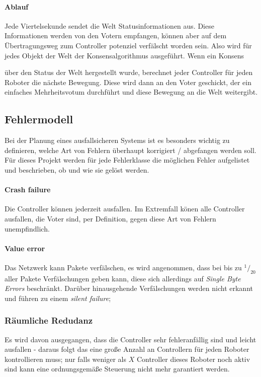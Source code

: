 \paragraph{Ablauf} Jede Viertelsekunde sendet die Welt Statusinformationen aus. Diese Informationen werden von den Votern empfangen, k{\"{o}}nnen
aber auf dem {\"{U}}bertragungsweg zum Controller potenziel verf{\"{a}}lscht worden sein. Also wird f{\"{u}}r jedes Objekt der Welt der Konsensalgorithmus ausgef{\"{u}}hrt. Wenn ein Konsens {\"{u}ber den Status der Welt hergestellt wurde, berechnet 
jeder Controller f{\"{u}}r jeden Roboter die n{\"{a}}chste Bewegung. Diese wird dann an den Voter geschickt, der ein einfaches Mehrheitsvotum durchf{\"{u}}hrt und diese Bewegung an die Welt weitergibt.

\subsection{Fehlermodell} \label{error-model}
Bei der Planung eines ausfallsicheren Systems ist es besonders wichtig zu definieren, welche Art von Fehlern
{\"{u}}berhaupt korrigiert / abgefangen werden soll. F{\"{u}}r dieses Projekt werden f{\"{u}}r jede Fehlerklasse
die m{\"{o}}glichen Fehler aufgelistet und beschrieben, ob und wie sie gel{\"{o}}st werden.

\paragraph{Crash failure} Die Controller k{\"{o}}nnen jederzeit ausfallen. Im Extremfall k{\"{o}}nen alle Controller ausfallen, die Voter sind, per Definition, gegen diese Art von Fehlern unempfindlich.

\paragraph{Value error} Das Netzwerk kann Pakete verf{\"{a}}lschen, es wird angenommen, dass bei bis zu $^1/_{20}$ aller Pakete Verf{\"{a}}lschungen geben kann, diese sich allerdings auf \textit{Single Byte Errors} beschr{\"{a}}nkt.
Dar{\"{u}}ber hinausgehende Verf{\"{a}}lschungen werden nicht erkannt und f{\"{u}}hren zu einem \textit{silent failure}; 

\subsubsection{R{\"{a}}umliche Redudanz}
Es wird davon ausgegangen, dass die Controller sehr fehleranf{\"{a}}llig sind und leicht ausfallen - daraus folgt das eine gro{\ss}e
Anzahl an Controllern f{\"{u}}r jeden Roboter kontrollieren muss; nur falls weniger als $X$ Controller dieses Roboter noch aktiv
sind kann eine ordnungsgem{\"{a}}{\ss}e Steuerung nicht mehr garantiert werden.

}
